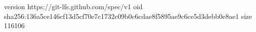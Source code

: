 version https://git-lfs.github.com/spec/v1
oid sha256:136a5ce146cf13d5cf70e7c1732c09b0c6cdae8f5895ae9c6ce5d3debb0e8ae1
size 116106

